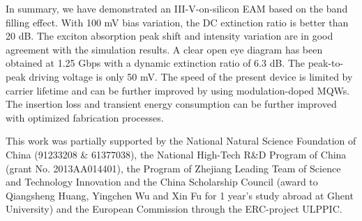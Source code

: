 \documentclass[aip,apl,reprint,a4paper]{revtex4-1}
\begin{document}
In summary, we have demonstrated an III-V-on-silicon EAM based on the band filling effect. With 100 mV bias variation, the DC extinction ratio is better than 20 dB. The exciton absorption peak shift and intensity variation are in good agreement with the simulation results. A clear open eye diagram has been obtained at 1.25 Gbps with a dynamic extinction ratio of 6.3 dB. The peak-to-peak driving voltage is only 50 mV. The speed of the present device is limited by carrier lifetime and can be further improved by using modulation-doped MQWs. The insertion loss and transient energy consumption can be further improved with optimized fabrication processes. 

\begin{acknowledgments}
This work was partially supported by the National Natural Science Foundation of China (91233208 \& 61377038), the National High-Tech R\&D Program of China (grant No. 2013AA014401), the Program of Zhejiang Leading Team of Science and Technology Innovation and the China Scholarship Council (award to Qiangsheng Huang, Yingchen Wu and Xin Fu for 1 year’s study abroad at Ghent University) and the European Commission through the ERC-project ULPPIC.
\end{acknowledgments}


\end{document}
